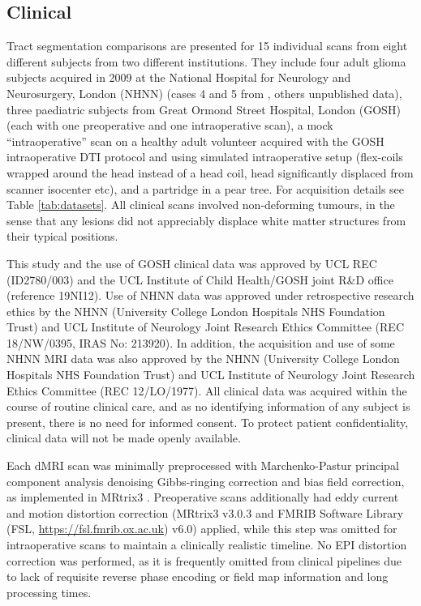 \subsection{Clinical}

Tract segmentation comparisons are presented for 15 individual scans from eight different subjects from two different institutions.
They include four adult glioma subjects acquired in 2009 at the National Hospital for Neurology and Neurosurgery, London (NHNN) (cases 4 and 5 from \textcite{Mancini2022}, others unpublished data),
three paediatric subjects from Great Ormond Street Hospital, London (GOSH) (each with one preoperative and one intraoperative scan),
a mock “intraoperative” scan on a healthy adult volunteer acquired with the GOSH intraoperative DTI protocol and using simulated intraoperative setup (flex-coils wrapped around the head instead of a head coil, head significantly displaced from scanner isocenter etc),
and a partridge in a pear tree.
For acquisition details see Table \ref{tab:datasets}.
All clinical scans involved non-deforming tumours, in the sense that any lesions did not appreciably displace white matter structures from their typical positions.

This study and the use of GOSH clinical data was approved by UCL REC (ID2780/003) and the UCL Institute of Child Health/GOSH joint R\&D office (reference 19NI12).
Use of NHNN data was approved under retrospective research ethics by the NHNN (University College London Hospitals NHS Foundation Trust) and UCL Institute of Neurology Joint Research Ethics Committee (REC 18/NW/0395, IRAS No: 213920).
In addition, the acquisition and use of some NHNN MRI data was also approved by the NHNN (University College London Hospitals NHS Foundation Trust) and UCL Institute of Neurology Joint Research Ethics Committee (REC 12/LO/1977).
All clinical data was acquired within the course of routine clinical care, and as no identifying information of any subject is present, there is no need for informed consent.
To protect patient confidentiality, clinical data will not be made openly available.

Each dMRI scan was minimally preprocessed with Marchenko-Pastur principal component analysis denoising\autocite{Veraart2016, Cordero-Grande2019} Gibbs-ringing correction\autocite{Kellner2016} and bias field correction,\autocite{Zhang2001, Smith2004} as implemented in MRtrix3 \autocite{Tournier2019}.
Preoperative scans additionally had eddy current and motion distortion correction\autocite{Andersson2016a, Smith2004} (MRtrix3 v3.0.3 and FMRIB Software Library (FSL, \url{https://fsl.fmrib.ox.ac.uk}) v6.0) applied, while this step was omitted for intraoperative scans to maintain a clinically realistic timeline.
No EPI distortion correction was performed, as it is frequently omitted from clinical pipelines due to lack of requisite reverse phase encoding or field map information and long processing times.\autocite{Yang2022}

